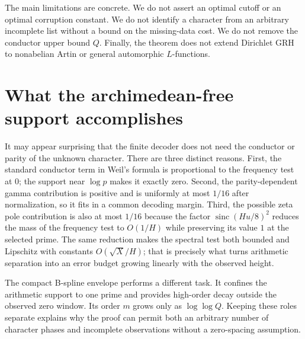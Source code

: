 \documentclass[11pt,letterpaper]{article}
\theoremstyle{definition}\newtheorem{definition}[theorem]{Definition}
\theoremstyle{remark}\newtheorem{remark}[theorem]{Remark}
\newcommand{\sinc}{\operatorname{sinc}}
\begin{document}
The main limitations are concrete. We do not assert an optimal
cutoff or an optimal corruption constant. We do not identify a
character from an arbitrary incomplete list without a bound on the
missing-data cost. We do not remove the conductor upper bound $Q$.
Finally, the theorem does not extend Dirichlet GRH to nonabelian
Artin or general automorphic $L$-functions.

\appendix
\section{What the archimedean-free support accomplishes}

It may appear surprising that the finite decoder does not need the
conductor or parity of the unknown character. There are three
distinct reasons. First, the standard conductor term in Weil's
formula is proportional to the frequency test at $0$; the support
near $\log p$ makes it exactly zero. Second, the parity-dependent
gamma contribution is positive and is uniformly at most $1/16$
after normalization, so it fits in a common decoding margin.
Third, the possible zeta pole contribution is also at most $1/16$
because the factor $\sinc(Hu/8)^2$ reduces the mass of the frequency
test to $O(1/H)$ while preserving its value $1$ at the selected
prime. The same reduction makes the spectral test both bounded and
Lipschitz with constants $O(\sqrt X/H)$; that is precisely what
turns arithmetic separation into an error budget growing linearly
with the observed height.

The compact B-spline envelope performs a different task. It confines
the arithmetic support to one prime and provides high-order decay
outside the observed zero window. Its order $m$ grows only as
$\log\log Q$. Keeping these roles separate explains why the proof
can permit both an arbitrary number of character phases and
incomplete observations without a zero-spacing assumption.
\end{document}
